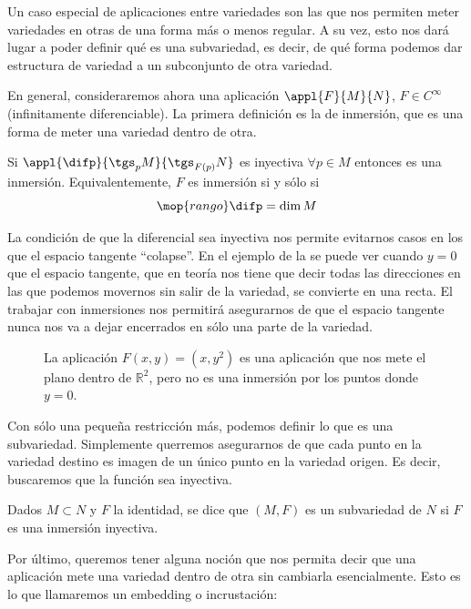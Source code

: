 \documentclass[palatino, bibnumbers]{apuntes}
\begin{document}
Un caso especial de aplicaciones entre variedades son las que nos permiten meter variedades en otras de una forma más o menos regular. A su vez, esto nos dará lugar a poder definir qué es una subvariedad, es decir, de qué forma podemos dar estructura de variedad a un subconjunto de otra variedad.

En general, consideraremos ahora una aplicación $\appl{F}{M}{N}$, $F ∈ C^∞$ (infinitamente diferenciable). La primera definición es la de inmersión, que es una forma de meter una variedad dentro de otra.

\begin{defn}[Inmersión] Si $\appl{\difp}{\tgs_p M}{\tgs_{F(p)} N}$ es inyectiva $∀p ∈ M$ entonces es una inmersión. Equivalentemente, $F$ es inmersión si y sólo si \[ \mop{rango} \difp  = \dim M\]
\end{defn}

La condición de que la diferencial sea inyectiva nos permite evitarnos casos en los que el espacio tangente ``colapse''. En el ejemplo de la  se puede ver cuando $y = 0$ que el espacio tangente, que en teoría nos tiene que decir todas las direcciones en las que podemos movernos sin salir de la variedad, se convierte en una recta. El trabajar con inmersiones nos permitirá asegurarnos de que el espacio tangente nunca nos va a dejar encerrados en sólo una parte de la variedad.

\begin{figure}[hbtp]
\centering
{}
\caption{La aplicación $F(x,y) = (x, y^2)$ es una aplicación que nos mete el plano dentro de $ℝ^2$, pero no es una inmersión por los puntos donde $y = 0$.}
\label{fig:FuncionNoInmersion}
\end{figure}

Con sólo una pequeña restricción más, podemos definir lo que es una subvariedad. Simplemente querremos asegurarnos de que cada punto en la variedad destino es imagen de un único punto en la variedad origen. Es decir, buscaremos que la función sea inyectiva.

\begin{defn}[Subvariedad] Dados $M ⊂ N$ y $F$ la identidad, se dice que $(M,F)$ es un subvariedad de $N$ si $F$ es una inmersión inyectiva.
\end{defn}

Por último, queremos tener alguna noción que nos permita decir que una aplicación mete una variedad dentro de otra sin cambiarla esencialmente. Esto es lo que llamaremos un embedding o incrustación:
\end{document}
